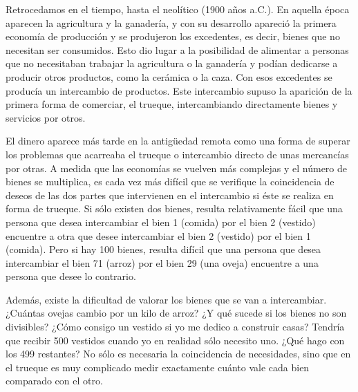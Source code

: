 \documentclass[
]{krantz}
\begin{document}
Retrocedamos en el tiempo, hasta el neolítico (1900 años a.C.). En aquella época aparecen la agricultura y la ganadería, y con su desarrollo apareció la primera economía de producción y se produjeron los excedentes, es decir, bienes que no necesitan ser consumidos. Esto dio lugar a la posibilidad de alimentar a personas que no necesitaban trabajar la agricultura o la ganadería y podían dedicarse a producir otros productos, como la cerámica o la caza. Con esos excedentes se producía un intercambio de productos. Este intercambio supuso la aparición de la primera forma de comerciar, el trueque, intercambiando directamente bienes y servicios por otros.

El dinero aparece más tarde en la antigüedad remota como una forma de superar los problemas que acarreaba el trueque o intercambio directo de unas mercancías por otras. A medida que las economías se vuelven más complejas y el número de bienes se multiplica, es cada vez más difícil que se verifique la coincidencia de deseos de las dos partes que intervienen en el intercambio si éste se realiza en forma de trueque. Si sólo existen dos bienes, resulta relativamente fácil que una persona que desea intercambiar el bien 1 (comida) por el bien 2 (vestido) encuentre a otra que desee intercambiar el bien 2 (vestido) por el bien 1 (comida). Pero si hay 100 bienes, resulta difícil que una persona que desea intercambiar el bien 71 (arroz) por el bien 29 (una oveja) encuentre a una persona que desee lo contrario.

Además, existe la dificultad de valorar los bienes que se van a intercambiar. ¿Cuántas ovejas cambio por un kilo de arroz? ¿Y qué sucede si los bienes no son divisibles? ¿Cómo consigo un vestido si yo me dedico a construir casas? Tendría que recibir 500 vestidos cuando yo en realidad sólo necesito uno. ¿Qué hago con los 499 restantes? No sólo es necesaria la coincidencia de necesidades, sino que en el trueque es muy complicado medir exactamente cuánto vale cada bien comparado con el otro.
\end{document}
